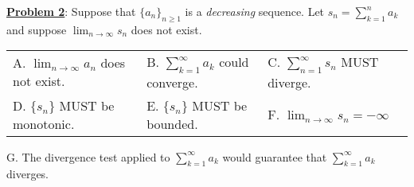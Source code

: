 \documentclass[12pt]{article}
\begin{document}
\textbf{\underline{Problem 2}}: Suppose that $\displaystyle\{a_n\}_{n \geq 1}$ is a \emph{decreasing} sequence.  Let $s_n =\displaystyle  \sum^n_{k=1} a_k$ and suppose $\displaystyle \lim_{n \rightarrow \infty} s_n$ does  not exist.
\vspace{3mm}

\begin{tabular}{lll}
A. $\displaystyle \lim_{n \rightarrow \infty} a_n$ does not exist. \qquad  \qquad  & B. $\displaystyle  \sum^{\infty}_{k=1} a_k$ could converge. \qquad    & C.  $\displaystyle \sum^{\infty}_{n=1} s_n$ MUST diverge.   \\ [3ex] 
D. $\{ s_n \}$ MUST be monotonic.  \qquad  & E. $\{ s_n \}$ MUST be bounded.   \qquad  &F. $\displaystyle \lim_{n \rightarrow \infty} s_n = -\infty$ \\
\end{tabular}

\vspace{1mm}

\hspace{.5mm} G. The divergence test applied to $\displaystyle \sum^{\infty}_{k= 1} a_k$ would guarantee that $\displaystyle \sum^{\infty}_{k=1} a_k$ diverges.
\end{document}
